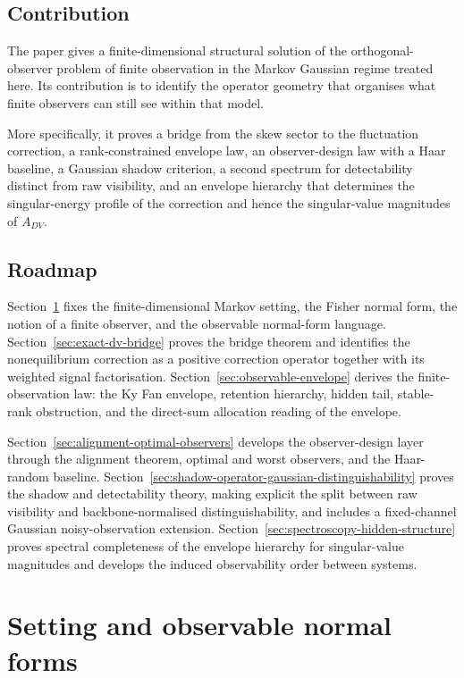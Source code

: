 \documentclass[11pt,a4paper]{article}
\numberwithin{equation}{section}
\theoremstyle{thmcompact}
\theoremstyle{remark}
\begin{document}
\subsection{Contribution}

The paper gives a finite-dimensional structural solution of the orthogonal-observer problem of finite observation in the Markov Gaussian regime treated here. Its contribution is to identify the operator geometry that organises what finite observers can still see within that model.

More specifically, it proves a bridge from the skew sector to the fluctuation correction, a rank-constrained envelope law, an observer-design law with a Haar baseline, a Gaussian shadow criterion, a second spectrum for detectability distinct from raw visibility, and an envelope hierarchy that determines the singular-energy profile of the correction and hence the singular-value magnitudes of \(A_{DV}\).

\subsection{Roadmap}

Section~\ref{sec:setting-observable-normal-forms} fixes the finite-dimensional Markov setting, the Fisher normal form, the notion of a finite observer, and the observable normal-form language. Section~\ref{sec:exact-dv-bridge} proves the bridge theorem and identifies the nonequilibrium correction as a positive correction operator together with its weighted signal factorisation. Section~\ref{sec:observable-envelope} derives the finite-observation law: the Ky Fan envelope, retention hierarchy, hidden tail, stable-rank obstruction, and the direct-sum allocation reading of the envelope.

Section~\ref{sec:alignment-optimal-observers} develops the observer-design layer through the alignment theorem, optimal and worst observers, and the Haar-random baseline. Section~\ref{sec:shadow-operator-gaussian-distinguishability} proves the shadow and detectability theory, making explicit the split between raw visibility and backbone-normalised distinguishability, and includes a fixed-channel Gaussian noisy-observation extension. Section~\ref{sec:spectroscopy-hidden-structure} proves spectral completeness of the envelope hierarchy for singular-value magnitudes and develops the induced observability order between systems.

\section{Setting and observable normal forms}
\label{sec:setting-observable-normal-forms}
\end{document}

